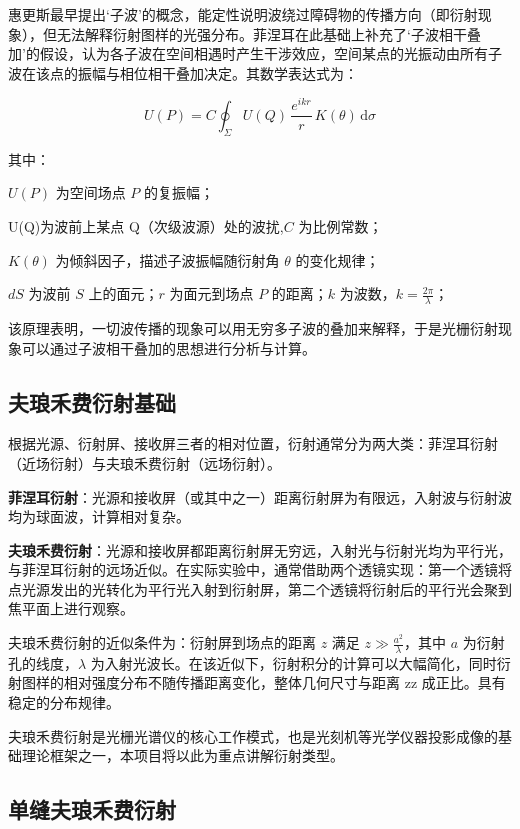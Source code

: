 \documentclass[12pt,a4paper]{ctexrep}
\begin{document}
惠更斯最早提出‘子波’的概念，能定性说明波绕过障碍物的传播方向（即衍射现象），但无法解释衍射图样的光强分布。菲涅耳在此基础上补充了‘子波相干叠加’的假设，认为各子波在空间相遇时产生干涉效应，空间某点的光振动由所有子波在该点的振幅与相位相干叠加决定。其数学表达式为：

\begin{equation*}
U(P)=C\oint_{\Sigma}U(Q)\,\frac{e^{ikr}}{r}\,K(\theta)\,\mathrm{d}\sigma
\end{equation*}

其中：

$U(P)$ 为空间场点 $P$ 的复振幅；

U(Q)为波前上某点 Q（次级波源）处的波扰,$C$ 为比例常数；

$K(\theta)$ 为倾斜因子，描述子波振幅随衍射角 $\theta$ 的变化规律；

$dS$ 为波前 $S$ 上的面元；$r$ 为面元到场点 $P$ 的距离；$k$ 为波数，$k=\frac{2\pi}{\lambda}$；

该原理表明，一切波传播的现象可以用无穷多子波的叠加来解释，于是光栅衍射现象可以通过子波相干叠加的思想进行分析与计算。

\subsection{夫琅禾费衍射基础}

根据光源、衍射屏、接收屏三者的相对位置，衍射通常分为两大类：菲涅耳衍射（近场衍射）与夫琅禾费衍射（远场衍射）。

\textbf{菲涅耳衍射}：光源和接收屏（或其中之一）距离衍射屏为有限远，入射波与衍射波均为球面波，计算相对复杂。

\textbf{夫琅禾费衍射}：光源和接收屏都距离衍射屏无穷远，入射光与衍射光均为平行光，与菲涅耳衍射的远场近似。在实际实验中，通常借助两个透镜实现：第一个透镜将点光源发出的光转化为平行光入射到衍射屏，第二个透镜将衍射后的平行光会聚到焦平面上进行观察。

夫琅禾费衍射的近似条件为：衍射屏到场点的距离 $z$ 满足 $z\gg\frac{{a}^{2}}{\lambda}$，其中 $a$ 为衍射孔的线度，$\lambda$ 为入射光波长。在该近似下，衍射积分的计算可以大幅简化，同时衍射图样的相对强度分布不随传播距离变化，整体几何尺寸与距离 zz 成正比。具有稳定的分布规律。

夫琅禾费衍射是光栅光谱仪的核心工作模式，也是光刻机等光学仪器投影成像的基础理论框架之一，本项目将以此为重点讲解衍射类型。

\subsection{单缝夫琅禾费衍射}
\end{document}
